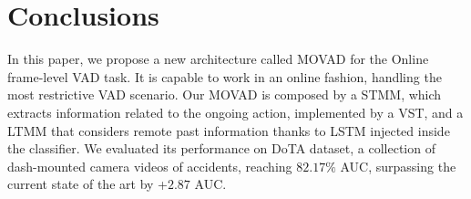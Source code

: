 \section{Conclusions}
\label{sec:conclusions}

In this paper, we propose a new architecture called MOVAD for the Online frame-level VAD task.
It is capable to work in an online fashion, handling the most restrictive VAD scenario. 
Our MOVAD is composed by a STMM, which extracts information related to the ongoing action, implemented by a VST, and a LTMM that considers remote past information thanks to LSTM injected inside the classifier.
We evaluated its performance on DoTA dataset, a collection of dash-mounted camera videos of accidents, reaching $82.17\%$ AUC, surpassing the current state of the art by +$2.87$ AUC.